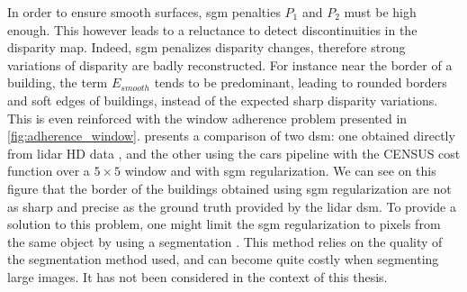 In order to ensure smooth surfaces, \acrshort{sgm} penalties $P_1$ and $P_2$ must be high enough. This however leads to a reluctance to detect discontinuities in the disparity map. Indeed, \acrshort{sgm} penalizes disparity changes, therefore strong variations of disparity are badly reconstructed. For instance near the border of a building, the term $E_{smooth}$ tends to be predominant, leading to rounded borders and soft edges of buildings, instead of the expected sharp disparity variations. This is even reinforced with the window adherence problem presented in \ref{fig:adherence_window}.  presents a comparison of two \acrshort{dsm}: one obtained directly from \acrshort{lidar} HD data \cite{monnet_lidarhd_2023}, and the other using the \acrshort{cars} pipeline with the CENSUS cost function over a $5\times5$ window and with \acrshort{sgm} regularization. We can see on this figure that the border of the buildings obtained using \acrshort{sgm} regularization are not as sharp and precise as the ground truth provided by the \acrshort{lidar} \acrshort{dsm}. To provide a solution to this problem, one might limit the \acrshort{sgm} regularization to pixels from the same object by using a segmentation \cite{dumas_improving_2022}. This method relies on the quality of the segmentation method used, and can become quite costly when segmenting large images. It has not been considered in the context of this thesis.

